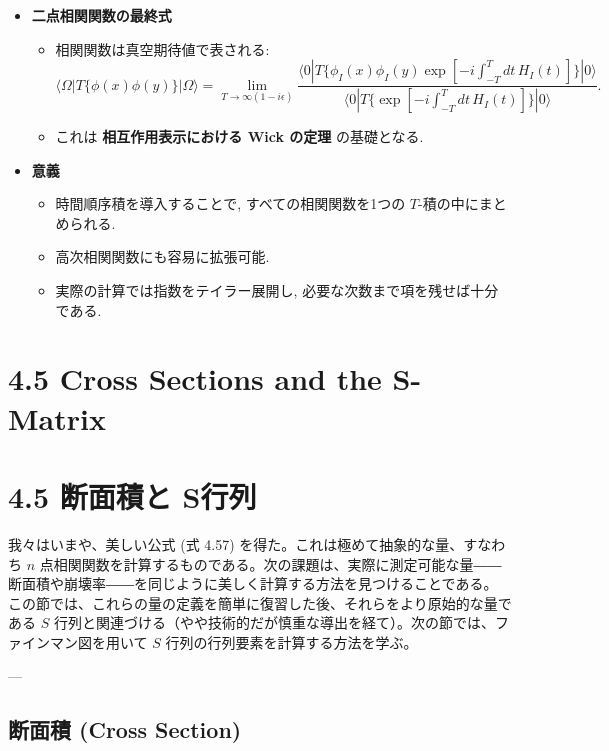 \documentclass[a4paper,12pt]{article}
\begin{document}
\begin{itemize}
  \item \textbf{二点相関関数の最終式}
  \begin{itemize}
    \item 相関関数は真空期待値で表される:
    \begin{equation*}
      \langle \Omega | T\{\phi(x)\phi(y)\} | \Omega \rangle
      = \lim_{T \to \infty (1-i\epsilon)}
      \frac{\langle 0 | T \{ \phi_I(x)\phi_I(y)\exp[-i\int_{-T}^T dt\, H_I(t)] \} | 0 \rangle}
      {\langle 0 | T \{ \exp[-i\int_{-T}^T dt\, H_I(t)] \} | 0 \rangle}.
    \end{equation*}
    \item これは \textbf{相互作用表示における Wick の定理} の基礎となる.
  \end{itemize}

  \item \textbf{意義}
  \begin{itemize}
    \item 時間順序積を導入することで, すべての相関関数を1つの $T$-積の中にまとめられる.
    \item 高次相関関数にも容易に拡張可能.
    \item 実際の計算では指数をテイラー展開し, 必要な次数まで項を残せば十分である.
  \end{itemize}

\end{itemize}
\newpage
\color{black}
\section*{4.5 Cross Sections and the S-Matrix}

\section*{4.5 断面積と S行列}

我々はいまや、美しい公式 (式 4.57) を得た。これは極めて抽象的な量、すなわち
$n$ 点相関関数を計算するものである。次の課題は、実際に測定可能な量――断面積や崩壊率――を同じように美しく計算する方法を見つけることである。
この節では、これらの量の定義を簡単に復習した後、それらをより原始的な量である
$S$ 行列と関連づける（やや技術的だが慎重な導出を経て）。次の節では、ファインマン図を用いて
$S$ 行列の行列要素を計算する方法を学ぶ。

---

\subsection*{断面積 (Cross Section)}
\end{document}

